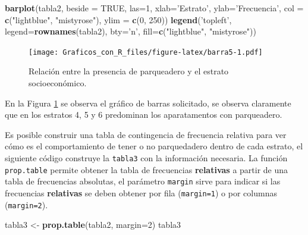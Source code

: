 \documentclass[10pt,]{krantz}
\makeatletter
\newenvironment{Shaded}{\begin{snugshade}}{\end{snugshade}}
\newcommand{\KeywordTok}[1]{\textcolor[rgb]{0.13,0.29,0.53}{\textbf{{#1}}}}
\newcommand{\DataTypeTok}[1]{\textcolor[rgb]{0.13,0.29,0.53}{{#1}}}
\newcommand{\DecValTok}[1]{\textcolor[rgb]{0.00,0.00,0.81}{{#1}}}
\newcommand{\StringTok}[1]{\textcolor[rgb]{0.31,0.60,0.02}{{#1}}}
\newcommand{\OtherTok}[1]{\textcolor[rgb]{0.56,0.35,0.01}{{#1}}}
\newcommand{\NormalTok}[1]{{#1}}
\newenvironment{kframe}{%
\medskip{}
\setlength{\fboxsep}{.8em}
 \def\at@end@of@kframe{}%
 \ifinner\ifhmode%
  \def\at@end@of@kframe{\end{minipage}}%
  \begin{minipage}{\columnwidth}%
 \fi\fi%
 \def\FrameCommand##1{\hskip\@totalleftmargin \hskip-\fboxsep
 \colorbox{shadecolor}{##1}\hskip-\fboxsep
     \hskip-\linewidth \hskip-\@totalleftmargin \hskip\columnwidth}%
 \MakeFramed {\advance\hsize-\width
   \@totalleftmargin\z@ \linewidth\hsize
   \@setminipage}}%
 {\par\unskip\endMakeFramed%
 \at@end@of@kframe}
\renewenvironment{Shaded}{\begin{kframe}}{\end{kframe}}
\makeatother
\begin{document}
\begin{Shaded}
\begin{Highlighting}[]
\KeywordTok{barplot}\NormalTok{(tabla2, }\DataTypeTok{beside =} \OtherTok{TRUE}\NormalTok{, }\DataTypeTok{las=}\DecValTok{1}\NormalTok{, }
        \DataTypeTok{xlab=}\StringTok{'Estrato'}\NormalTok{, }\DataTypeTok{ylab=}\StringTok{'Frecuencia'}\NormalTok{,}
        \DataTypeTok{col =} \KeywordTok{c}\NormalTok{(}\StringTok{"lightblue"}\NormalTok{, }\StringTok{"mistyrose"}\NormalTok{),}
        \DataTypeTok{ylim =} \KeywordTok{c}\NormalTok{(}\DecValTok{0}\NormalTok{, }\DecValTok{250}\NormalTok{))}
\KeywordTok{legend}\NormalTok{(}\StringTok{'topleft'}\NormalTok{, }\DataTypeTok{legend=}\KeywordTok{rownames}\NormalTok{(tabla2), }\DataTypeTok{bty=}\StringTok{'n'}\NormalTok{,}
       \DataTypeTok{fill=}\KeywordTok{c}\NormalTok{(}\StringTok{"lightblue"}\NormalTok{, }\StringTok{"mistyrose"}\NormalTok{))}
\end{Highlighting}
\end{Shaded}

\begin{figure}[htbp]
\centering
\texttt{[image: Graficos\_con\_R\_files/figure-latex/barra5-1.pdf]}
\caption{\label{fig:barra5}Relación entre la presencia de parqueadero y el
estrato socioeconómico.}
\end{figure}

En la Figura \ref{fig:barra5} se observa el gráfico de barras
solicitado, se observa claramente que en los estratos 4, 5 y 6
predominan los aparatamentos con parqueadero.

Es posible construir una tabla de contingencia de frecuencia relativa
para ver cómo es el comportamiento de tener o no parquedadero dentro de
cada estrato, el siguiente código construye la \texttt{tabla3} con la
información necesaria. La función \texttt{prop.table} permite obtener la
tabla de frecuencias \textbf{relativas} a partir de una tabla de
frecuencias absolutas, el parámetro \texttt{margin} sirve para indicar
si las frecuencias \textbf{relativas} se deben obtener por fila
(\texttt{margin=1}) o por columnas (\texttt{margin=2}).

\begin{Shaded}
\begin{Highlighting}[]
\NormalTok{tabla3 <-}\StringTok{ }\KeywordTok{prop.table}\NormalTok{(tabla2, }\DataTypeTok{margin=}\DecValTok{2}\NormalTok{)}
\NormalTok{tabla3}
\end{Highlighting}
\end{Shaded}
\end{document}
